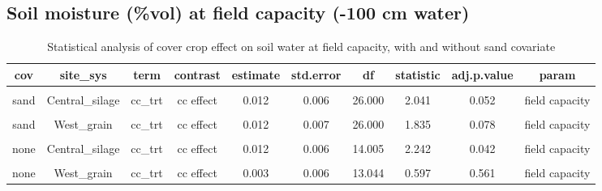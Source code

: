 \documentclass[
]{article}
\begin{document}
\hypertarget{soil-moisture-vol-at-field-capacity--100-cm-water}{%
\subsection{Soil moisture (\%vol) at field capacity (-100 cm
water)}\label{soil-moisture-vol-at-field-capacity--100-cm-water}}

\begin{table}[H]

\caption{\label{tab:fc}Statistical analysis of cover crop effect on soil water at field capacity, with and without sand covariate}
\centering
\begin{tabular}[t]{cccccccccc}
\toprule
cov & site\_sys & term & contrast & estimate & std.error & df & statistic & adj.p.value & param\\
\midrule
\cellcolor{gray!6}{sand} & \cellcolor{gray!6}{Central\_grain} & \cellcolor{gray!6}{cc\_trt} & \cellcolor{gray!6}{cc effect} & \cellcolor{gray!6}{-0.002} & \cellcolor{gray!6}{0.006} & \cellcolor{gray!6}{26.000} & \cellcolor{gray!6}{-0.430} & \cellcolor{gray!6}{0.671} & \cellcolor{gray!6}{field capacity}\\
\cmidrule{1-10}
sand & Central\_silage & cc\_trt & cc effect & 0.012 & 0.006 & 26.000 & 2.041 & 0.052 & field capacity\\
\cmidrule{1-10}
\cellcolor{gray!6}{sand} & \cellcolor{gray!6}{East\_grain} & \cellcolor{gray!6}{cc\_trt} & \cellcolor{gray!6}{cc effect} & \cellcolor{gray!6}{-0.002} & \cellcolor{gray!6}{0.006} & \cellcolor{gray!6}{26.000} & \cellcolor{gray!6}{-0.353} & \cellcolor{gray!6}{0.727} & \cellcolor{gray!6}{field capacity}\\
\cmidrule{1-10}
sand & West\_grain & cc\_trt & cc effect & 0.012 & 0.007 & 26.000 & 1.835 & 0.078 & field capacity\\
\cmidrule{1-10}
\cellcolor{gray!6}{none} & \cellcolor{gray!6}{Central\_grain} & \cellcolor{gray!6}{cc\_trt} & \cellcolor{gray!6}{cc effect} & \cellcolor{gray!6}{-0.004} & \cellcolor{gray!6}{0.005} & \cellcolor{gray!6}{13.044} & \cellcolor{gray!6}{-0.800} & \cellcolor{gray!6}{0.438} & \cellcolor{gray!6}{field capacity}\\
\cmidrule{1-10}
none & Central\_silage & cc\_trt & cc effect & 0.012 & 0.006 & 14.005 & 2.242 & 0.042 & field capacity\\
\cmidrule{1-10}
\cellcolor{gray!6}{none} & \cellcolor{gray!6}{East\_grain} & \cellcolor{gray!6}{cc\_trt} & \cellcolor{gray!6}{cc effect} & \cellcolor{gray!6}{-0.007} & \cellcolor{gray!6}{0.006} & \cellcolor{gray!6}{13.044} & \cellcolor{gray!6}{-1.317} & \cellcolor{gray!6}{0.211} & \cellcolor{gray!6}{field capacity}\\
\cmidrule{1-10}
none & West\_grain & cc\_trt & cc effect & 0.003 & 0.006 & 13.044 & 0.597 & 0.561 & field capacity\\
\bottomrule
\end{tabular}
\end{table}
\end{document}
